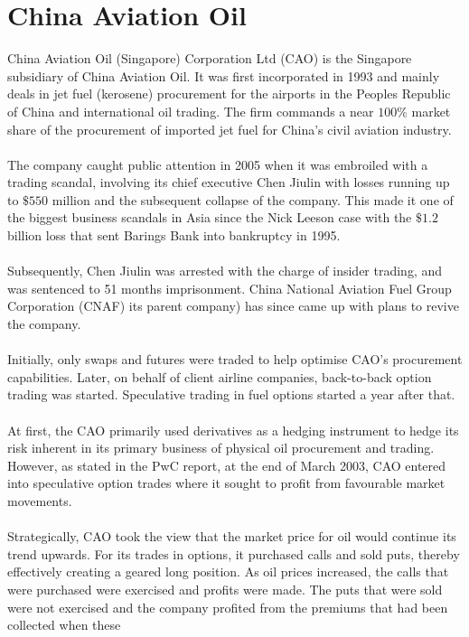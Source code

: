 \section{China Aviation Oil }
\noindent China Aviation Oil (Singapore) Corporation Ltd (CAO) is
the Singapore subsidiary of China Aviation Oil. It was first
incorporated in 1993 and mainly deals in jet fuel (kerosene)
procurement for the airports in the Peoples Republic of China and
international oil trading. The firm commands a near $100\%$ market
share of the procurement of imported jet fuel for China's civil
aviation industry.
\\
\\
The company caught public attention in 2005 when it was embroiled
with a trading scandal, involving its chief executive Chen Jiulin
with losses running up to $\$550$ million and the subsequent
collapse of the company. This made it one of the biggest business
scandals in Asia since the Nick Leeson case with the $\$1.2$
billion loss that sent Barings Bank into bankruptcy in 1995.
\\
\\
Subsequently, Chen Jiulin was arrested with the charge of insider
trading, and was sentenced to 51 months imprisonment. China
National Aviation Fuel Group Corporation (CNAF) its parent
company) has since came up with plans to revive the company.
\\
\\
Initially, only swaps and futures were traded to help optimise
CAO's procurement capabilities. Later, on behalf of client airline
companies, back-to-back option trading was started. Speculative
trading in fuel options started a year after that.
\\
\\
At first, the CAO primarily used derivatives as a hedging
instrument to hedge its risk inherent in its primary business of
physical oil procurement and trading. However, as stated in the
PwC report, at the end of March 2003, CAO entered into speculative
option trades where it sought to profit from favourable market
movements.\\\\ Strategically, CAO took the view that the market
price for oil would continue its trend upwards. For its trades in
options, it purchased calls and sold puts, thereby effectively
creating a geared long position. As oil prices increased, the
calls that were purchased were exercised and profits were made.
The puts that were sold were not exercised and the company
profited from the premiums that had been collected when these
